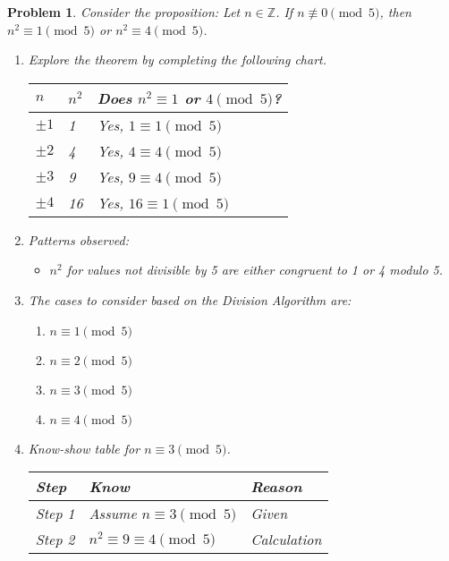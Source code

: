 \documentclass[12pt]{article}
\newtheorem{problem}{Problem}
\theoremstyle{definition}
\begin{document}
\begin{problem}
Consider the proposition: Let \( n \in \mathbb{Z} \). If \( n \not\equiv 0 \pmod{5} \), then \( n^2 \equiv 1 \pmod{5} \) or \( n^2 \equiv 4 \pmod{5} \).

\begin{enumerate}[label=(\alph*)]
    \item Explore the theorem by completing the following chart.
    
    \begin{center}
        \begin{tabular}{|p{}|p{}|p{}|}
        \hline
        \( n \) & \( n^2 \) & Does \( n^2 \equiv 1 \) or \( 4 \pmod{5} \)? \\
        \hline
        \( \pm1 \) & 1 & Yes, \( 1 \equiv 1 \pmod{5} \) \\
        \( \pm2 \) & 4 & Yes, \( 4 \equiv 4 \pmod{5} \) \\
        \( \pm3 \) & 9 & Yes, \( 9 \equiv 4 \pmod{5} \) \\
        \( \pm4 \) & 16 & Yes, \( 16 \equiv 1 \pmod{5} \) \\
        \hline
        \end{tabular}
    \end{center}
    
    \item Patterns observed: 
        \begin{itemize}
            \item \( n^2 \) for values not divisible by 5 are either congruent to 1 or 4 modulo 5.
        \end{itemize}
    
    \item The cases to consider based on the Division Algorithm are:
    \begin{enumerate}
        \item \( n \equiv 1 \pmod{5} \)
        \item \( n \equiv 2 \pmod{5} \)
        \item \( n \equiv 3 \pmod{5} \)
        \item \( n \equiv 4 \pmod{5} \)
    \end{enumerate}

    \item Know-show table for \( n \equiv 3 \pmod{5} \).
    
    \begin{center}
        \begin{tabular}{|p{}|p{}|p{}|}
        \hline
        \textbf{Step} & \textbf{Know} & \textbf{Reason} \\
        \hline
        Step 1 & Assume \( n \equiv 3 \pmod{5} \) & Given \\
        \hline
        Step 2 & \( n^2 \equiv 9 \equiv 4 \pmod{5} \) & Calculation \\
        \hline
        \end{tabular}
    \end{center}
\end{enumerate}
\end{problem}
\end{document}
